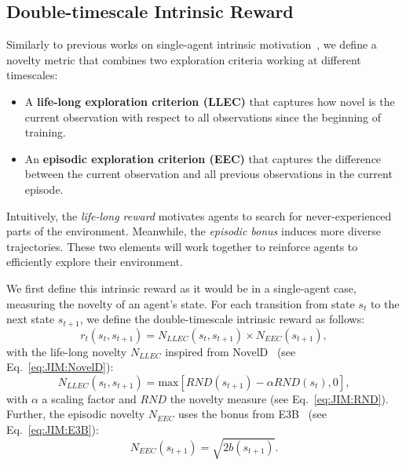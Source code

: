 \subsection{Double-timescale Intrinsic Reward}\label{sec:JIM:DoubleTimeReward}

Similarly to previous works on single-agent intrinsic motivation~\citep{Badia2020_NGU}, we define a novelty metric that combines two exploration criteria working at different timescales:
\begin{itemize}
    \item A \textbf{life-long exploration criterion (LLEC)} that captures how novel is the current observation with respect to all observations since the beginning of training.
    \item An \textbf{episodic exploration criterion (EEC)} that captures the difference between the current observation and all previous observations in the current episode. 
\end{itemize}
Intuitively, the \textit{life-long reward} motivates agents to search for never-experienced parts of the environment. Meanwhile, the \textit{episodic bonus} induces more diverse trajectories. These two elements will work together to reinforce agents to efficiently explore their environment. 

We first define this intrinsic reward as it would be in a single-agent case, measuring the novelty of an agent's state. For each transition from state $s_t$ to the next state $s_{t+1}$, we define the double-timescale intrinsic reward as follows: 
\begin{equation}\label{eq:JIM:IntrRew}
    r_t(s_t, s_{t+1}) = N_{LLEC}(s_t,s_{t+1})\times N_{EEC}(s_{t+1}),
\end{equation}
with the life-long novelty $N_{LLEC}$ inspired from NovelD~\citep{Zhang2021_NovelD} (see Eq.~\eqref{eq:JIM:NovelD}):
\begin{equation}\label{eq:JIM:LLEC}
    N_{LLEC}(s_t, s_{t+1}) = \mathrm{max}[RND(s_{t+1}) - \alpha RND(s_t), 0],
\end{equation}
with $\alpha$ a scaling factor and $RND$ the novelty measure (see Eq.~\eqref{eq:JIM:RND}). Further, the episodic novelty $N_{EEC}$ uses the bonus from E3B~\citep{Henaff2022_E3B} (see Eq.~\eqref{eq:JIM:E3B}):
\begin{equation}\label{eq:JIM:EEC}
    N_{EEC}(s_{t+1}) = \sqrt{2b(s_{t+1})}.
\end{equation}

